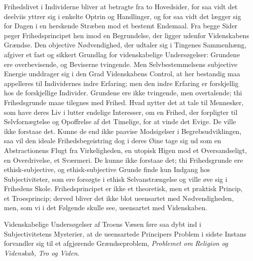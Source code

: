 \documentclass[12pt]{article}
\newcommand{\opage}[1]{\marginnote{\footnotesize\textit{[#1]}}}
\begin{document}
Frihedslivet i Individerne bliver at betragte fra to Hovedsider, for
saa vidt det deelviis yttrer sig i enkelte Optrin og Handlinger, og
for saa vidt det lægger sig for Dagen i en herskende Stræben mod et
bestemt Endemaal. Fra begge Sider peger Frihedsprincipet hen imod en
Begrundelse, der ligger udenfor Videnskabens Grændse. Den objective
Nødvendighed, der udtaler sig i Tingenes Sammenhæng, afgiver et fast
og sikkert Grundlag for videnskabelige Undersøgelser: Grundene ere
overbevisende, og Beviserne tvingende. Men Selvbestemmelsens
subjective Energie unddrager sig i den Grad Videnskabens Control, at
her bestandig maa appelleres til Individernes indre Erfaring; men
den indre Erfaring er forskjellig hos de forskjellige Individer.
Grundene ere ikke tvingende, men overtalende; thi Frihedsgrunde maae
tilegnes med Frihed. Hvad nytter det
\opage{64} at tale til Mennesker, som have deres Liv i lutter endelige
Interesser, om en Frihed, der forpligter til Selvfornægtelse og
Opoffrelse af det Timelige, for at vinde det Evige. De ville ikke
forstaae det. Kunne de end ikke paavise Modsigelser i
Begrebsudviklingen, saa vil den ideale Frihedsbegeistring dog i
deres Øine tage sig ud som en Abstractionens Flugt fra
Virkeligheden, en utopisk Higen mod et Oversandseligt, en
Overdrivelse, et Sværmeri. De kunne ikke forstaae det; thi
Frihedsgrunde ere ethisk-subjective, og ethisk-subjective Grunde
finde kun Indgang hos Subjectiviteter, som ere forsøgte i ethisk
Selvanstrængelse og ville øve sig i Frihedens Skole. Frihedsprincipet
er ikke et theoretisk, men et praktisk Princip, et Troesprincip;
derved bliver det ikke blot ueensartet med Nødvendigheden, men, som
vi i det Følgende skulle see, ueensartet med Videnskaben.

Videnskabelige Undersøgelser af Troens Væsen føre saa dybt ind i
Subjectivitetens Mysterier, at de ueensartede Principers Problem i
sidste Instans forvandler sig til et afgjørende Grændseproblem,
\emph{Problemet om Religion og Videnskab, Tro og Viden}.
\end{document}
